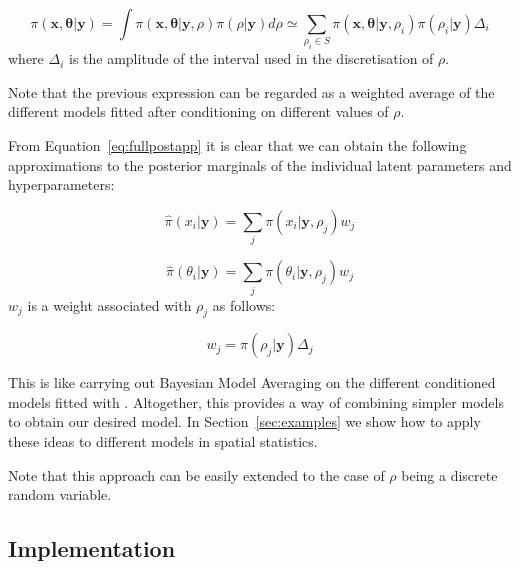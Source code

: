 \documentclass[article]{jss}
\begin{document}
\begin{equation}
\pi(\mathbf{x}, \mathbf{\theta}|\mathbf{y}) = \int \pi(\mathbf{x}, \mathbf{\theta}|\mathbf{y}, \rho)\pi(\rho|\mathbf{y})d\rho
\simeq
\sum_{\rho_i\in S}\pi(\mathbf{x}, \mathbf{\theta}|\mathbf{y}, \rho_i)  
\pi(\rho_i|\mathbf{y}) \Delta_i
\label{eq:fullpostapp}
\end{equation}
\noindent
where $\Delta_i$ is the amplitude of the interval used in the discretisation
of $\rho$.

Note that the previous expression can be regarded as a weighted average
of the different models fitted after conditioning on different values of
$\rho$.

From Equation~\ref{eq:fullpostapp} it is clear that we can obtain the following
approximations to the posterior marginals of the individual latent parameters
and hyperparameters:

\begin{equation}
\hat{\pi}(x_i|\mathbf{y}) = \sum_j \pi(x_i|\mathbf{y}, \rho_j) w_j
\end{equation}

\begin{equation}
\hat{\pi}(\theta_i|\mathbf{y}) = \sum_j \pi(\theta_i|\mathbf{y}, \rho_j) w_j
\end{equation}
\noindent
$w_j$ is a weight associated with $\rho_j$ as follows:

\begin{equation}
w_j = \pi(\rho_j|\mathbf{y})\Delta_j
\end{equation}


This is like carrying out Bayesian Model Averaging \citep{Hoetingetal:1999} on the
different conditioned models fitted with . Altogether, this
provides a way of combining simpler models to obtain our desired model. In
Section~\ref{sec:examples} we show how to apply these ideas to different models
in spatial statistics.


%

Note that this approach can be easily extended to the case of $\rho$ being
a discrete random variable.


\subsection{Implementation}
\end{document}
